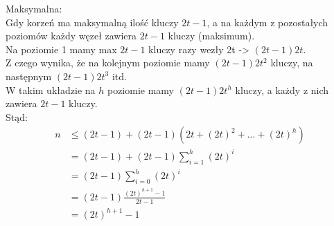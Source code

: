 \documentclass[18pt]{extarticle}
\begin{document}
Maksymalna: \\
Gdy korzeń ma maksymalną ilość kluczy $2t-1$, a na każdym z pozostałych poziomów każdy węzeł zawiera $2t-1$ kluczy (maksimum). \\
Na poziomie 1 mamy max $2t-1$ kluczy razy wezły 2t -> $(2t-1)2t$. \\
Z czego wynika, że na kolejnym poziomie mamy $(2t-1)2t^2$ kluczy, na następnym $(2t-1)2t^3$ itd. \\
W takim układzie na $h$ poziomie mamy $(2t-1)2t^{h}$ kluczy, a każdy z nich zawiera $2t-1$ kluczy. \\
Stąd: \\
\begin{align*}
    n &\leq (2t-1) + (2t-1)(2t + {(2t)}^2 + ... + {(2t)}^{h}) \\
    &= (2t-1) + (2t-1)\sum_{i=1}^{h}{(2t)}^{i} \\
    &= (2t-1)\sum_{i=0}^{h}{(2t)}^{i} \\
    &= (2t-1)\frac{{(2t)}^{h+1}-1}{2t-1} \\
    &= {(2t)}^{h+1}-1
\end{align*}
\end{document}
